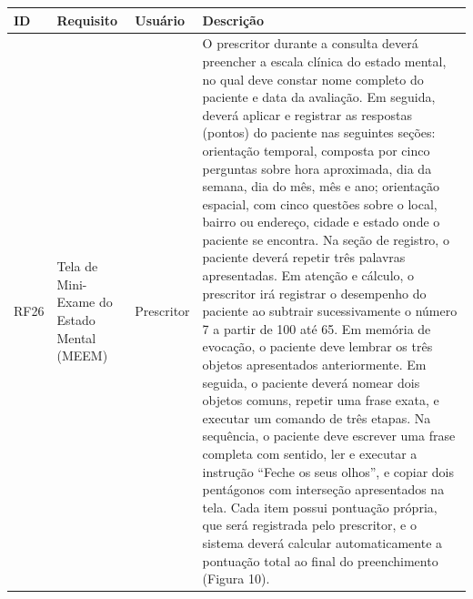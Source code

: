 \href{}{}\documentclass[12pt,portuguese,oneside]{article}
\begin{document}
\begin{table}[H]
\centering
{}
\begin{tabularx}{\textwidth}{|>{\raggedright\arraybackslash}p{1cm}|>{\raggedright\arraybackslash}p{3cm}|>{\raggedright\arraybackslash}p{2cm}|>{\raggedright\arraybackslash}X|}
\hline
\rowcolor{gray!20}
\textbf{ID} & \textbf{Requisito} & \textbf{Usuário} & \textbf{Descrição}\\
\hline
RF26 & Tela de Mini-Exame do Estado Mental (MEEM) & Prescritor &
O prescritor durante a consulta deverá preencher a escala clínica do estado mental, no qual deve constar nome completo do paciente e data da avaliação. Em seguida, deverá aplicar e registrar as respostas (pontos) do paciente nas seguintes seções: orientação temporal, composta por cinco perguntas sobre hora aproximada, dia da semana, dia do mês, mês e ano; orientação espacial, com cinco questões sobre o local, bairro ou endereço, cidade e estado onde o paciente se encontra. Na seção de registro, o paciente deverá repetir três palavras apresentadas. Em atenção e cálculo, o prescritor irá registrar o desempenho do paciente ao subtrair sucessivamente o número 7 a partir de 100 até 65. Em memória de evocação, o paciente deve lembrar os três objetos apresentados anteriormente. Em seguida, o paciente deverá nomear dois objetos comuns, repetir uma frase exata, e executar um comando de três etapas. Na sequência, o paciente deve escrever uma frase completa com sentido, ler e executar a instrução “Feche os seus olhos”, e copiar dois pentágonos com interseção apresentados na tela. Cada item possui pontuação própria, que será registrada pelo prescritor, e o sistema deverá calcular automaticamente a pontuação total ao final do preenchimento (Figura 10).\\
\hline
\end{tabularx}
\end{table}
\end{document}
